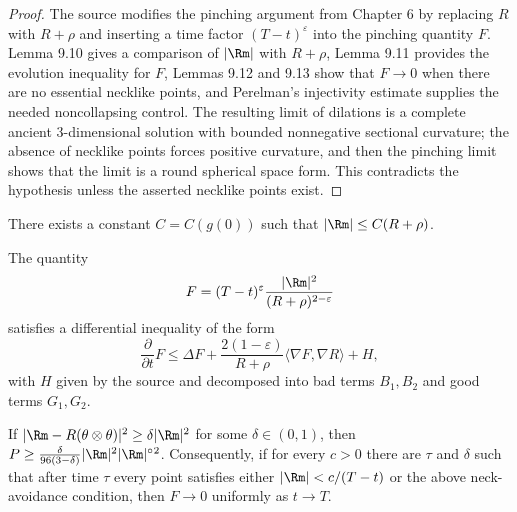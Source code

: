 \begin{proof}
\sketch The source modifies the pinching argument from Chapter 6 by replacing \(R\) with \(R+\rho\) and inserting a time factor \((T-t)^\varepsilon\) into the pinching quantity \(F\). Lemma 9.10 gives a comparison of \(|\Rm|\) with \(R+\rho\), Lemma 9.11 provides the evolution inequality for \(F\), Lemmas 9.12 and 9.13 show that \(F\to 0\) when there are no essential necklike points, and Perelman's injectivity estimate supplies the needed noncollapsing control. The resulting limit of dilations is a complete ancient \(3\)-dimensional solution with bounded nonnegative sectional curvature; the absence of necklike points forces positive curvature, and then the pinching limit shows that the limit is a round spherical space form. This contradicts the hypothesis unless the asserted necklike points exist.
\end{proof}

\begin{lemma}
\label{ch09-lem-curvature-vs-scalar}

There exists a constant \(C=C(g(0))\) such that \(|\Rm|\le C(R+\rho)\).
\end{lemma}

\begin{lemma}
\label{ch09-lem-modified-pinching-evolution}

The quantity
\[
F=(T-t)^\varepsilon \frac{|\Rm|^2}{(R+\rho)^{2-\varepsilon}}
\]
satisfies a differential inequality of the form
\[
\frac{\partial}{\partial t}F\le \Delta F+\frac{2(1-\varepsilon)}{R+\rho}\langle \nabla F,\nabla R\rangle+H,
\]
with \(H\) given by the source and decomposed into bad terms \(B_1,B_2\) and good terms \(G_1,G_2\).
\end{lemma}

\begin{lemma}
\label{ch09-lem-pinching-improves-away-from-necks}

If \(|\Rm-R(\theta\otimes\theta)|^2\ge \delta |\Rm|^2\) for some \(\delta\in(0,1)\), then \(P\ge \frac{\delta}{96(3-\delta)}|\Rm|^2|\Rm|^{\circ}{}^2\). Consequently, if for every \(c>0\) there are \(\tau\) and \(\delta\) such that after time \(\tau\) every point satisfies either \(|\Rm|<c/(T-t)\) or the above neck-avoidance condition, then \(F\to 0\) uniformly as \(t\to T\).
\end{lemma}

